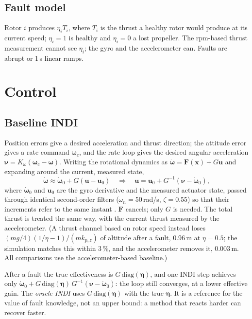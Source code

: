 \documentclass[preprint,12pt,a4paper]{elsarticle}
\newcommand{\vect}[1]{\bm{#1}}
\begin{document}
\subsection{Fault model}
Rotor $i$ produces $\eta_i T_i$, where $T_i$ is the thrust a healthy rotor would produce at its current speed; $\eta_i = 1$
is healthy and $\eta_i = 0$ a lost propeller. The rpm-based thrust measurement cannot see $\eta_i$; the gyro and the
accelerometer can. Faults are abrupt or 1\,s linear ramps.

\section{Control}
\subsection{Baseline INDI}
Position errors give a desired acceleration and thrust direction; the attitude error gives a rate command $\vect\omega_c$, and
the rate loop gives the desired angular acceleration $\vect\nu = K_\omega(\vect\omega_c - \vect\omega)$. Writing the rotational
dynamics as $\dot{\vect\omega} = \vect F(\vect x) + G\vect u$ and expanding around the current, measured state,
\begin{equation}
\dot{\vect\omega} \approx \dot{\vect\omega}_0 + G(\vect u - \vect u_0)
\quad\Rightarrow\quad
\vect u = \vect u_0 + G^{-1}(\vect\nu - \dot{\vect\omega}_0),
\label{eq:indi}
\end{equation}
where $\dot{\vect\omega}_0$ and $\vect u_0$ are the gyro derivative and the measured actuator state, passed through identical
second-order filters ($\omega_n = 50$\,rad/s, $\zeta = 0.55$) so that their increments refer to the same instant \cite{smeur2016}.
$\vect F$ cancels; only $G$ is needed. The total thrust is treated the same way, with the current thrust measured by the
accelerometer. (A thrust channel based on rotor speed instead loses $(mg/4)(1/\eta - 1)/(m k_{p,z})$ of altitude after a fault,
0.96\,m at $\eta = 0.5$; the simulation matches this within 3\,\%, and the accelerometer removes it, 0.003\,m. All comparisons use
the accelerometer-based baseline.)

After a fault the true effectiveness is $G\,\mathrm{diag}(\vect\eta)$, and one INDI step achieves only
$\dot{\vect\omega}_0 + G\,\mathrm{diag}(\vect\eta)\,G^{-1}(\vect\nu - \dot{\vect\omega}_0)$: the loop still converges, at a
lower effective gain. The \emph{oracle INDI} uses $G\,\mathrm{diag}(\vect\eta)$ with the true $\vect\eta$. It is a reference
for the value of fault knowledge, not an upper bound: a method that reacts harder can recover faster.
\end{document}
